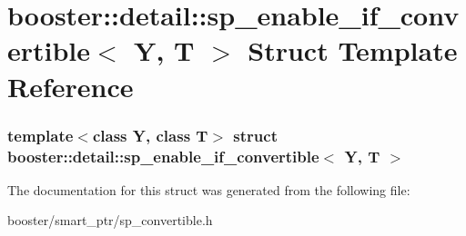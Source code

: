 \section{booster\-:\-:detail\-:\-:sp\-\_\-enable\-\_\-if\-\_\-convertible$<$ \-Y, \-T $>$ \-Struct \-Template \-Reference}
\label{structbooster_1_1detail_1_1sp__enable__if__convertible}
\subsubsection*{template$<$class Y, class T$>$ struct booster\-::detail\-::sp\-\_\-enable\-\_\-if\-\_\-convertible$<$ Y, T $>$}



\-The documentation for this struct was generated from the following file\-:\begin{DoxyCompactItemize}
\item 
booster/smart\-\_\-ptr/sp\-\_\-convertible.\-h\end{DoxyCompactItemize}
